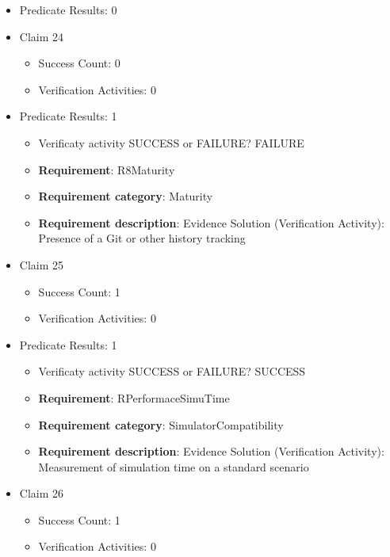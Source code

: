 \documentclass{article}
\begin{document}
\begin{itemize}
									    
				\item Predicate Results: 0

  				  \item Claim 24
				\begin{itemize}
			    	\item Success Count: 0 
			    	\item Verification Activities: 0
				\end{itemize}
				
									    
				\item Predicate Results: 1
					\begin{itemize}				
					\item Verificaty activity SUCCESS or FAILURE? FAILURE
					
					\item \textbf{Requirement}: R8Maturity 
					\item \textbf{Requirement category}: Maturity
					\item \textbf{Requirement description}: Evidence Solution (Verification Activity): Presence of a Git or other history tracking
					\end{itemize}

  				  \item Claim 25
				\begin{itemize}
			    	\item Success Count: 1 
			    	\item Verification Activities: 0
				\end{itemize}
				
									    
				\item Predicate Results: 1
					\begin{itemize}				
					\item Verificaty activity SUCCESS or FAILURE? SUCCESS
					
					\item \textbf{Requirement}: RPerformaceSimuTime 
					\item \textbf{Requirement category}: SimulatorCompatibility
					\item \textbf{Requirement description}: Evidence Solution (Verification Activity): Measurement of simulation time on a standard scenario
					\end{itemize}

  				  \item Claim 26
				\begin{itemize}
			    	\item Success Count: 1 
			    	\item Verification Activities: 0
				\end{itemize}
				

\end{itemize}
\end{document}
